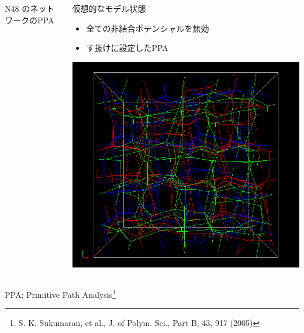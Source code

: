 \documentclass[12pt, dvipdfmx]{beamer}
\begin{document}
\begin{frame}
\begin{columns}[T, onlytextwidth]
\begin{block}{N48 のネットワークのPPA}
			\end{block}
			\begin{block}{仮想的なモデル状態}
				\begin{itemize}
					\item 全ての非結合ポテンシャルを無効
					\item す抜けに設定したPPA
				\end{itemize}
				\begin{center}
					\includegraphics[width=.65\textwidth]{PPA_sunuke_NW.png}
				\end{center}
			\end{block}
		\end{columns}
        \vspace{-2mm}
        \small
		\begin{screen}
			PPA: Primitive Path Analysis\footnote{
                S. K. Sukumaran, et al., J. of Polym. Sci., Part B, 43, 917 (2005)
            }
		\end{screen}
\end{frame}
\end{document}
